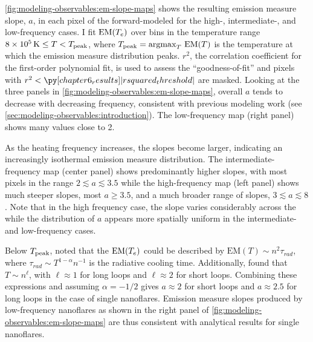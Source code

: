 \autoref{fig:modeling-observables:em-slope-maps} shows the resulting emission measure slope, $a$, in each pixel of the forward-modeled \AR{} for the high-, intermediate-, and low-frequency cases. I fit $\textup{EM}(T_e)$ over bins in the temperature range $\SI{8e5}{\kelvin}\le T< T_\textup{peak}$, where $T_\textup{peak}=\operatorname*{argmax}_T\,\mathrm{EM}(T)$ is the temperature at which the emission measure distribution peaks. $r^2$, the correlation coefficient for the first-order polynomial fit, is used to assess the ``goodness-of-fit'' and pixels with $r^2<\py[chapter6_results]|rsquared_threshold|$ are masked. Looking at the three panels in \autoref{fig:modeling-observables:em-slope-maps}, overall $a$ tends to decrease with decreasing frequency, consistent with previous modeling work (see \autoref{sec:modeling-observables:introduction}). The low-frequency map (right panel) shows many values close to 2.

As the heating frequency increases, the slopes become larger, indicating an increasingly isothermal emission measure distribution. The intermediate-frequency map (center panel) shows predominantly higher slopes, with most pixels in the range $2\lesssim a \lesssim 3.5$ while the high-frequency map (left panel) shows much steeper slopes, most $a\ge3.5$, and a much broader range of slopes, $3\lesssim a \lesssim 8$. Note that in the high frequency case, the slope varies considerably across the \AR{} while the distribution of $a$ appears more spatially uniform in the intermediate- and low-frequency cases.

Below $T_\textup{peak}$, \citet{cargill_implications_1994} noted that the $\textup{EM}(T_e)$ could be described by $\mathrm{EM}(T)\sim n^2\tau_{rad}$, where $\tau_{rad}\sim T^{1-\alpha}n^{-1}$ is the radiative cooling time. Additionally, \citet{bradshaw_cooling_2010} found that $T\sim n^{\ell}$, with $\ell\approx1$ for long loops and $\ell\approx2$ for short loops. Combining these expressions and assuming $\alpha=-1/2$ \citep{cargill_implications_1994} gives $a\approx2$ for short loops and $a\approx2.5$ for long loops in the case of single nanoflares. Emission measure slopes produced by low-frequency nanoflares as shown in the right panel of \autoref{fig:modeling-observables:em-slope-maps} are thus consistent with analytical results for single nanoflares.

